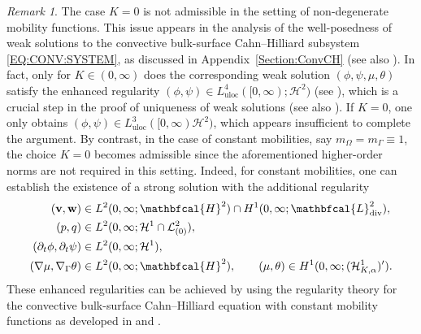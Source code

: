 \documentclass[10pt,reqno]{amsart}
\theoremstyle{remark}
\newtheorem{remark}[theorem]{Remark}
\numberwithin{equation}{section}
\newcommand{\bv}{\mathbf{v}}
\newcommand{\bw}{\mathbf{w}}
\newcommand{\delt}{\partial_{t}}
\newcommand{\Grad}{\nabla}
\newcommand{\Div}{\textnormal{div}}
\newcommand{\Gradg}{\nabla_\Ga}
\newcommand{\Om}{\Omega}
\newcommand{\Ga}{\Gamma}
\begin{document}
\begin{remark}
    The case $K = 0$ is not admissible in the setting of non-degenerate mobility functions. This issue appears in the analysis of the well-posedness of weak solutions to the convective bulk-surface Cahn--Hilliard subsystem \eqref{EQ:CONV:SYSTEM}, as discussed in Appendix~\ref{Section:ConvCH} (see also \cite{Stange2025}). In fact, only for $K \in (0,\infty)$ does the corresponding weak solution $(\phi,\psi,\mu,\theta)$ satisfy the enhanced regularity $(\phi,\psi)\in L^4_{\mathrm{uloc}}([0,\infty);\mathcal{H}^2)$ (see \cite[Theorem~3.3]{Giorgini2025}), which is a crucial step in the proof of uniqueness of weak solutions (see also \cite{Conti2024}). If $K=0$, one only obtains $(\phi,\psi)\in L^3_{\mathrm{uloc}}([0,\infty)\mathcal{H}^2)$, which appears insufficient to complete the argument.
    By contrast, in the case of constant mobilities, say $m_\Om = m_\Ga \equiv 1$, the choice $K=0$ becomes admissible since the aforementioned higher-order norms are not required in this setting. Indeed, for constant mobilities, one can establish the existence of a strong  solution with the additional regularity
    \begin{align*}
    (\bv,\bw) &\in L^2(0,\infty;\mathbfcal{H}^2)\cap H^1(0,\infty;\mathbfcal{L}^2_\Div), \\ 
    (p,q) &\in L^2(0,\infty;\mathcal{H}^1\cap\mathcal{L}^2_{(0)}), \\
    (\delt\phi,\delt\psi) &\in L^2(0,\infty;\mathcal{H}^1), \\
    (\Grad\mu,\Gradg\theta) &\in L^2(0,\infty;\mathbfcal{H}^2),
    \qquad (\mu,\theta)\in H^1(0,\infty;(\mathcal{H}^1_{K,\alpha})^\prime).
    \end{align*}
    These enhanced regularities can be achieved by using the regularity theory for the convective bulk-surface Cahn--Hilliard equation with constant mobility functions as developed in \cite{Knopf2025} and \cite{Giorgini2025}.
\end{remark}
\end{document}

